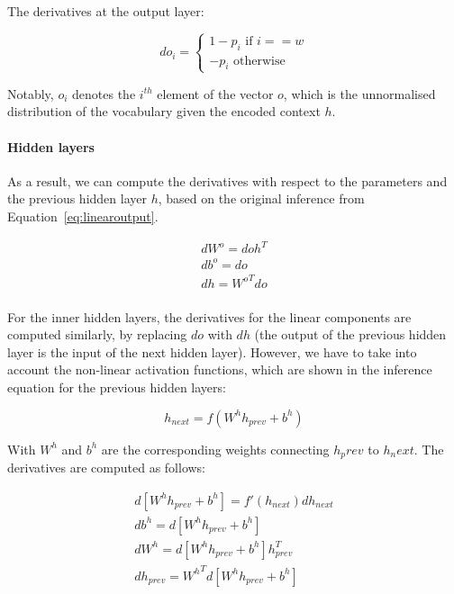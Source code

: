 The derivatives at the output layer:

\begin{equation}
do_i = 
\begin{cases}
1 - p_i \text{ if } i == w \\
-p_i \text{     otherwise}
\end{cases}
\end{equation}

Notably, $o_i$ denotes the $i^{th}$ element of the vector $o$, which is the unnormalised distribution of the vocabulary given the encoded context $h$. 

\paragraph{Hidden layers}
As a result, we can compute the derivatives with respect to the parameters and the previous hidden layer $h$, based on the original inference from Equation~\ref{eq:linearoutput}. 

\begin{equation}
\begin{aligned}
dW^o = doh^T \\
db^o = do \\ 
dh = {W^o}^Tdo \\
\end{aligned}
\end{equation}


For the inner hidden layers, the  derivatives for the linear components are computed similarly, by replacing $do$ with $dh$ (the output of the previous hidden layer is the input of the next hidden layer). However, we have to take into account the non-linear activation functions, which are shown in the inference equation for the previous hidden layers:

\begin{equation}
h_{next} = f(W^h h_{prev} + b^h)
\end{equation}

With $W^h$ and $b^h$ are the corresponding weights connecting $h_prev$ to $h_next$. The derivatives are computed as follows:

\begin{equation}
\begin{aligned}
d[W^h h_{prev} + b^h] = f'(h_{next}) dh_{next} \\
db^h = d[W^h h_{prev} + b^h] \\
dW^h = d[W^h h_{prev} + b^h]h_{prev}^T \\
dh_{prev} = {W^h}^T d[W^h h_{prev} + b^h]
\label{eq:dhidden}
\end{aligned} 
\end{equation}

